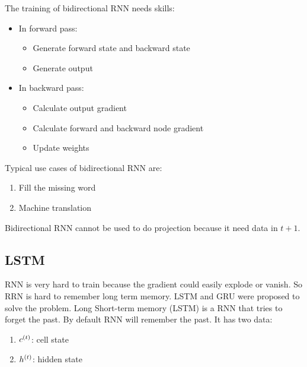 The training of bidirectional RNN needs skills:
\begin{itemize}
    \item In forward pass:
        \begin{itemize}
            \item Generate forward state and backward state
            \item Generate output
        \end{itemize}
    \item In backward pass:
        \begin{itemize}
            \item Calculate output gradient
            \item Calculate forward and backward node gradient
            \item Update weights
        \end{itemize}
\end{itemize}

Typical use cases of bidirectional RNN are:
\begin{enumerate}
    \item Fill the missing word
    \item Machine translation
\end{enumerate}

Bidirectional RNN cannot be used to do projection because it need data in $t+1$.

\subsection{LSTM}

RNN is very hard to train because the gradient could easily explode or vanish. So RRN is hard to remember long term memory. LSTM and GRU were proposed to solve the problem. Long Short-term memory (LSTM) is a RNN that tries to forget the past. By default RNN will remember the past. It has two data:
\begin{enumerate}
    \item ${c}^{(t)}$: cell state
    \item ${h}^{(t)}$: hidden state
\end{enumerate}


